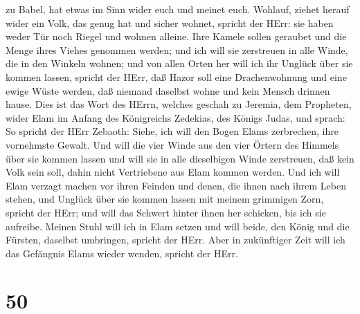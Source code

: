 zu Babel, hat etwas im Sinn wider euch und meinet euch. 
Wohlauf, ziehet herauf wider ein Volk, das genug hat und sicher wohnet,
spricht der HErr: sie haben weder Tür noch Riegel und wohnen alleine.
 Ihre Kamele sollen geraubet und die Menge ihres Viehes
genommen werden; und ich will sie zerstreuen in alle Winde, die in den
Winkeln wohnen; und von allen Orten her will ich ihr Unglück über sie
kommen lassen, spricht der HErr,  daß Hazor soll eine
Drachenwohnung und eine ewige Wüste werden, daß niemand daselbst wohne
und kein Mensch drinnen hause.  Dies ist das Wort des
HErrn, welches geschah zu Jeremia, dem Propheten, wider Elam im Anfang
des Königreichs Zedekias, des Königs Judas, und sprach:  So
spricht der HErr Zebaoth: Siehe, ich will den Bogen Elams zerbrechen,
ihre vornehmste Gewalt.  Und will die vier Winde aus den
vier Örtern des Himmels über sie kommen lassen und will sie in alle
dieselbigen Winde zerstreuen, daß kein Volk sein soll, dahin nicht
Vertriebene aus Elam kommen werden.  Und ich will Elam
verzagt machen vor ihren Feinden und denen, die ihnen nach ihrem Leben
stehen, und Unglück über sie kommen lassen mit meinem grimmigen Zorn,
spricht der HErr; und will das Schwert hinter ihnen her schicken, bis
ich sie aufreibe.  Meinen Stuhl will ich in Elam setzen und
will beide, den König und die Fürsten, daselbst umbringen, spricht der
HErr.  Aber in zukünftiger Zeit will ich das Gefängnis
Elams wieder wenden, spricht der HErr.

\hypertarget{section-49}{%
\section{50}\label{section-49}}

